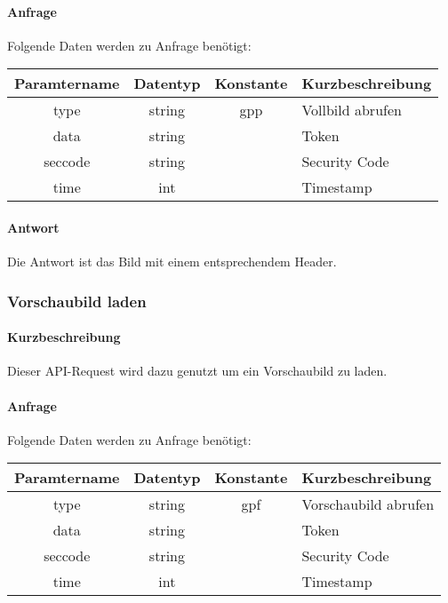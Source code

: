\paragraph{Anfrage}Folgende Daten werden zu Anfrage benötigt:
\begin{table}[H]
	\begin{tabular}{|c|c|c|p{6.5cm}|}
		\hline
		\textbf{Paramtername} & \textbf{Datentyp} & \textbf{Konstante} & \textbf{Kurzbeschreibung}                                                                                               \\ \hline
		type                & string            & gpp                & Vollbild abrufen \\ \hline
		data                & string            &                    & Token \\ \hline
		seccode             & string            &                    & Security Code \\ \hline
		time                & int               &                    & Timestamp \\ \hline
	\end{tabular}
\end{table}
\paragraph{Antwort}Die Antwort ist das Bild mit einem entsprechendem Header.
\subsubsection{Vorschaubild laden}
\paragraph{Kurzbeschreibung}Dieser API-Request wird dazu genutzt um ein Vorschaubild zu laden.
\paragraph{Anfrage}Folgende Daten werden zu Anfrage benötigt:
\begin{table}[H]
	\begin{tabular}{|c|c|c|p{6.5cm}|}
		\hline
		\textbf{Paramtername} & \textbf{Datentyp} & \textbf{Konstante} & \textbf{Kurzbeschreibung}                                                                                               \\ \hline
		type                & string            & gpf                & Vorschaubild abrufen \\ \hline
		data                & string            &                    & Token \\ \hline
		seccode             & string            &                    & Security Code \\ \hline
		time                & int               &                    & Timestamp \\ \hline
	\end{tabular}
\end{table}
